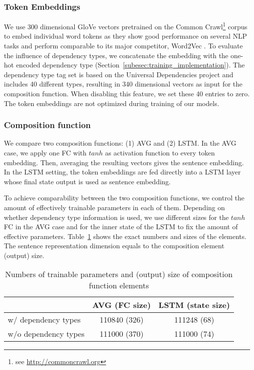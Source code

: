 \subsubsection{Token Embeddings}
We use 300 dimensional %
GloVe vectors \autocite{pennington_glove_2014} pretrained on the Common Crawl\footnote{see \url{http://commoncrawl.org}} corpus to embed individual word tokens as they show good performance on several \ac{NLP} tasks and perform comparable to its major competitor, Word2Vec \autocite{levy_improving_2015,naili_comparative_2017}. To evaluate the influence of dependency types, we concatenate the embedding with the one-hot encoded dependency type (Section~\ref{subesec:training_implementation}). %
The dependency type tag set is based on the Universal Dependencies project \autocite{nivre_universal_2016} and includes 40 different types, resulting in 340 dimensional vectors as input for the composition function. When disabling this feature, we set these 40 entries to zero. The token embeddings are not optimized during training of our models.   

\subsubsection{Composition function}
We compare two composition functions: (1) \acf{AVG} and (2) \acf{LSTM}. 
In the \ac{AVG} case, we apply one \acf{FC} with $tanh$ as activation function to every token embedding. Then, averaging the resulting vectors gives the sentence embedding.
In the \ac{LSTM} setting, the token embeddings are fed directly into a LSTM layer whose final state  output is used as sentence embedding. %

To achieve comparability between the two composition functions, we control the amount of effectively trainable parameters in each of them. Depending on whether dependency type information is used, we use different sizes for the $tanh$ \ac{FC} in the \ac{AVG} case and for the inner state of the \ac{LSTM} to fix the amount of effective parameters. Table~\ref{tab:sizes} shows the exact numbers and sizes of the elements. The sentence representation dimension equals to the composition element (output) size.  %

\begin{table}[!htb]
  \centering
  \begin{tabular}{ l | c | c }
      & AVG (FC size) & LSTM (state size) \\ \hline
    w/ dependency types & 110840 (326) & 111248 (68) \\ 
    w/o dependency types & 111000 (370) & 111000 (74) \\
  \end{tabular}
  \caption{Numbers of trainable parameters and (output) size of composition function elements}
  \label{tab:sizes}
\end{table}

